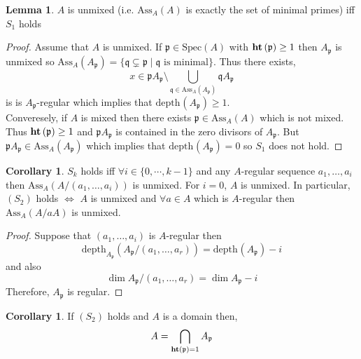 \documentclass[12pt]{article}
\newcommand{\Ass}[2]{\mathrm{Ass}_{#1}\left( #2 \right)}
\newcommand{\Spec}[1]{\mathrm{Spec}\left( #1 \right)}
\newcommand{\depth}[2]{\mathrm{depth}_{#1}\left(#2\right)}
\newcommand{\p}{\mathfrak{p}}
\newcommand{\q}{\mathfrak{q}}
\theoremstyle{remark}
\theoremstyle{definition}
\newtheorem{lemma}[theorem]{Lemma}
\newtheorem{corollary}[theorem]{Corollary}
\begin{document}
\begin{lemma}
$A$ is unmixed (i.e. $\Ass{A}{A}$ is exactly the set of minimal primes) iff $S_1$ holds
\end{lemma}

\begin{proof}
Assume that $A$ is unmixed. If $\p \in \Spec{A}$ with $\height{\p} \ge 1$ then $A_\p$ is unmixed so $\Ass{A}{A_\p} = \{ \q \subsetneq \p \mid \q \text{ is minimal} \}$. Thus there exists,
\[ x \in \p A_{\p} \setminus \bigcup_{\q \in \Ass{A}{A_\p}} \q A_\p \]
is is $A_{\p}$-regular which implies that $\depth{}{A_\p} \ge 1$.
\bigskip\\
Converesely, if $A$ is mixed then there exists $\p \in \Ass{A}{A}$ which is not mixed. Thus $\height{\p} \ge 1$ and $\p A_\p$ is contained in the zero divisors of $A_\p$. But $\p A_\p \in \Ass{A}{A_\p}$ which implies that $\depth{}{A_\p} =0$ so $S_1$ does not hold.  
\end{proof}

\begin{corollary}
$S_k$ holds iff $\forall i \in \{0, \cdots, k - 1\}$ and any $A$-regular sequence $a_1, \dots, a_i$ then $\Ass{A}{A / (a_1, \dots, a_i)}$ is unmixed. For $i = 0$, $A$ is unmixed. In particular, $(S_2)$ holds $\iff$ $A$ is unmixed and $\forall a \in A$ which is $A$-regular then $\Ass{A}{A / a A}$ is unmixed. 
\end{corollary}

\begin{proof}
Suppose that $(a_1, \dots, a_i)$ is $A$-regular then 
\[ \depth{A_\p}{A_\p / (a_1, \dots, a_r)} = \depth{}{A_\p} - i \]
and also 
\[ \dim{A_\p / (a_1, \dots, a_r)} = \dim{A_\p} - i \]
Therefore, $A_\p$ is regular. 
\end{proof}

\begin{corollary}
If $(S_2)$ holds and $A$ is a domain then,
\[ A = \bigcap_{\height{\p} = 1} A_\p \]
\end{corollary}
\end{document}
